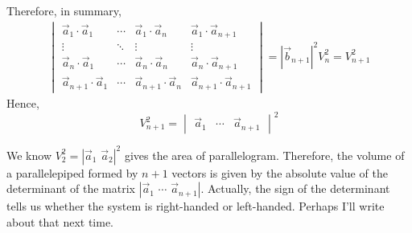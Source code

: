 \documentclass[letterpaper, 12pt]{article}
\theoremstyle{custom}
\begin{document}
Therefore, in summary,
\begin{align*}
    \begin{vmatrix}
      \vec{a}_1 \cdot \vec{a}_1 & \cdots & \vec{a}_1 \cdot \vec{a}_n & \vec{a}_1 \cdot \vec{a}_{n+1} \\
      \vdots & \ddots &  \vdots & \vdots\\
      \vec{a}_n \cdot \vec{a}_1 & \cdots & \vec{a}_n \cdot \vec{a}_n & \vec{a}_n \cdot \vec{a}_{n+1}\\
      \vec{a}_{n+1} \cdot \vec{a}_1 & \cdots & \vec{a}_{n+1} \cdot \vec{a}_n & \vec{a}_{n+1} \cdot \vec{a}_{n+1}
    \end{vmatrix}
    =\left| \vec{b}_{n+1} \right|^2 V_n^2 = V_{n+1}^2
\end{align*}
Hence,
\begin{equation*}
    V_{n+1}^2 = \begin{vmatrix}
      \vec{a}_1  & \cdots  & \vec{a}_{n+1} 
    \end{vmatrix}^2
\end{equation*}

We know $V_2^2 = \left| \vec{a}_1 \, \,  \vec{a}_2 \right|^2$ gives the area of parallelogram.
Therefore,  the volume of a parallelepiped formed by $n+1$ vectors is given by the absolute value of the determinant of the matrix
 $\left| \vec{a}_1 \, \, \cdots \, \, \vec{a}_{n+1} \right|$.
Actually, the sign of the determinant tells us whether the system is right-handed or left-handed.
Perhaps I'll write about that next time.
\end{document}
